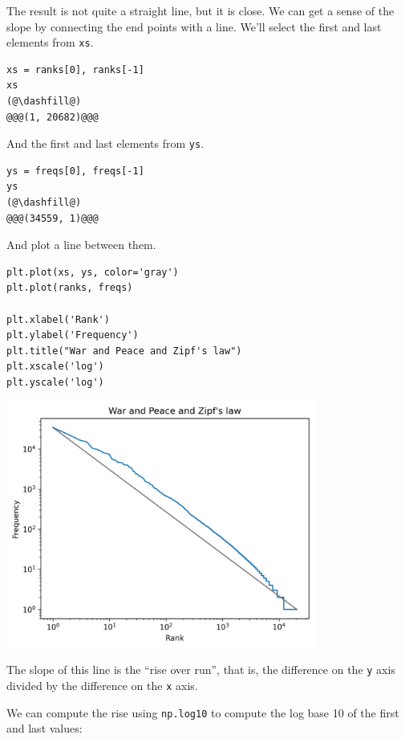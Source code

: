 The result is not quite a straight line, but it is close. We can get a
sense of the slope by connecting the end points with a line. We'll
select the first and last elements from \passthrough{\lstinline!xs!}.

\begin{lstlisting}[]
xs = ranks[0], ranks[-1]
xs
(@\dashfill@)
@@@(1, 20682)@@@
\end{lstlisting}

And the first and last elements from \passthrough{\lstinline!ys!}.

\begin{lstlisting}[]
ys = freqs[0], freqs[-1]
ys
(@\dashfill@)
@@@(34559, 1)@@@
\end{lstlisting}

And plot a line between them.

\begin{lstlisting}[]
plt.plot(xs, ys, color='gray')
plt.plot(ranks, freqs)

plt.xlabel('Rank')
plt.ylabel('Frequency')
plt.title("War and Peace and Zipf's law")
plt.xscale('log')
plt.yscale('log')
\end{lstlisting}

\begin{center}
\includegraphics[width=4in]{chapters/06_plotting_files/06_plotting_84_0.png}
\end{center}

The slope of this line is the ``rise over run'', that is, the difference
on the \passthrough{\lstinline!y!} axis divided by the difference on the
\passthrough{\lstinline!x!} axis.

We can compute the rise using \passthrough{\lstinline!np.log10!} to
compute the log base 10 of the first and last values:

